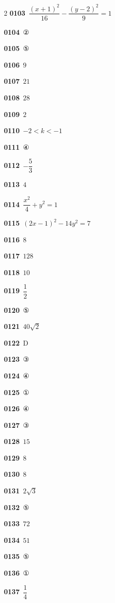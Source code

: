 \documentclass[10pt,a4paper]{article}
\newcommand{\pt}[1]{\mathrm{#1}}
\begin{document}
\begin{multicols}{2}
\noindent\textbf{0103}\ $\dfrac{(x+1)^2}{16}-\dfrac{(y-2)^2}{9}=1$\par
\noindent\textbf{0104}\ ②\par
\noindent\textbf{0105}\ ⑤\par
\noindent\textbf{0106}\ $9$\par
\noindent\textbf{0107}\ $21$\par
\noindent\textbf{0108}\ $28$\par
\noindent\textbf{0109}\ $2$\par
\noindent\textbf{0110}\ $-2<k<-1$\par
\noindent\textbf{0111}\ ④\par
\noindent\textbf{0112}\ $-\dfrac{5}{3}$\par
\noindent\textbf{0113}\ $4$\par
\noindent\textbf{0114}\ $\dfrac{x^2}{4}+y^2=1$\par
\noindent\textbf{0115}\ $(2x-1)^2-14y^2=7$\par
\noindent\textbf{0116}\ $8$\par
\noindent\textbf{0117}\ $128$\par
\noindent\textbf{0118}\ $10$\par
\noindent\textbf{0119}\ $\dfrac{1}{2}$\par
\noindent\textbf{0120}\ ⑤\par
\noindent\textbf{0121}\ $40\sqrt{2}$\par
\noindent\textbf{0122}\ $\pt{D}$\par
\noindent\textbf{0123}\ ③\par
\noindent\textbf{0124}\ ④\par
\noindent\textbf{0125}\ ①\par
\noindent\textbf{0126}\ ④\par
\noindent\textbf{0127}\ ③\par
\noindent\textbf{0128}\ $15$\par
\noindent\textbf{0129}\ $8$\par
\noindent\textbf{0130}\ $8$\par
\noindent\textbf{0131}\ $2\sqrt{3}$\par
\noindent\textbf{0132}\ ⑤\par
\noindent\textbf{0133}\ $72$\par
\noindent\textbf{0134}\ $51$\par
\noindent\textbf{0135}\ ⑤\par
\noindent\textbf{0136}\ ①\par
\noindent\textbf{0137}\ $\dfrac{1}{4}$\par

\end{multicols}
\end{document}
